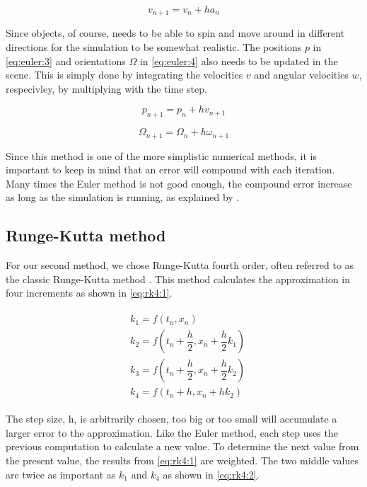 \documentclass[a4paper,12pt]{report}
\begin{document}
\begin{equation}
v_{n+1}=v_n+ha_n
\label{eq:euler:2}
\end{equation}

Since objects, of course, needs to be able to spin and move around in different directions for the simulation to be somewhat realistic. The positions $p$ in \eqref{eq:euler:3} and orientations $\Omega$ in \eqref{eq:euler:4} also needs to be updated in the scene. This is simply done by integrating the velocities $v$ and angular velocities $w$, respecivley, by multiplying with the time step.

\begin{equation}
p_{n+1}=p_n+hv_{n+1}
\label{eq:euler:3}
\end{equation}

\begin{equation}
\Omega_{n+1}=\Omega_n+h\omega_{n+1}
\label{eq:euler:4}
\end{equation}

Since this method is one of the more simplistic numerical methods, it is important to keep in mind that an error will compound with each iteration. Many times the Euler method is not good enough, the compound error increase as long as the simulation is running, as explained by \cite{gog}.

\subsection{Runge-Kutta method}

For our second method, we chose Runge-Kutta fourth order, often referred to as the classic Runge-Kutta method \cite{rk4}. This method calculates the approximation in four increments as shown in \eqref{eq:rk4:1}.

\begin{equation}
\begin{split}
\begin{aligned}
& k_{1} = f(t_{n}, x_{n}) \\
& k_{2} = f(t_{n}+\dfrac{h}{2}, x_{n}+\dfrac{h}{2}k_{1}) \\
& k_{3} = f(t_{n}+\dfrac{h}{2}, x_{n}+\dfrac{h}{2}k_{2}) \\
& k_{4} = f(t_{n}+h, x_{n}+hk_{2})
\end{aligned}
\end{split}
\label{eq:rk4:1}
\end{equation}

The step size, h, is arbitrarily chosen, too big or too small will accumulate a larger error to the approximation. Like the Euler method, each step uses the previous computation to calculate a new value. To determine the next value from the present value, the results from \eqref{eq:rk4:1} are weighted. The two middle values are twice as important as $k_1$ and $k_4$ as shown in \eqref{eq:rk4:2}.
\end{document}
